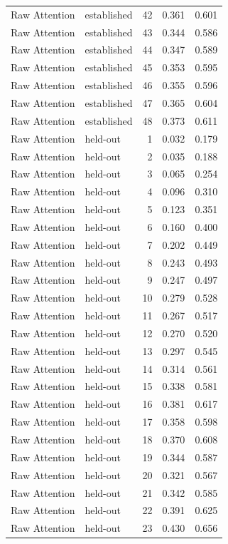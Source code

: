 \begin{tabular}{llrrr}
Raw Attention & established & 42 & 0.361 & 0.601 \\
Raw Attention & established & 43 & 0.344 & 0.586 \\
Raw Attention & established & 44 & 0.347 & 0.589 \\
Raw Attention & established & 45 & 0.353 & 0.595 \\
Raw Attention & established & 46 & 0.355 & 0.596 \\
Raw Attention & established & 47 & 0.365 & 0.604 \\
Raw Attention & established & 48 & 0.373 & 0.611 \\
Raw Attention & held-out & 1 & 0.032 & 0.179 \\
Raw Attention & held-out & 2 & 0.035 & 0.188 \\
Raw Attention & held-out & 3 & 0.065 & 0.254 \\
Raw Attention & held-out & 4 & 0.096 & 0.310 \\
Raw Attention & held-out & 5 & 0.123 & 0.351 \\
Raw Attention & held-out & 6 & 0.160 & 0.400 \\
Raw Attention & held-out & 7 & 0.202 & 0.449 \\
Raw Attention & held-out & 8 & 0.243 & 0.493 \\
Raw Attention & held-out & 9 & 0.247 & 0.497 \\
Raw Attention & held-out & 10 & 0.279 & 0.528 \\
Raw Attention & held-out & 11 & 0.267 & 0.517 \\
Raw Attention & held-out & 12 & 0.270 & 0.520 \\
Raw Attention & held-out & 13 & 0.297 & 0.545 \\
Raw Attention & held-out & 14 & 0.314 & 0.561 \\
Raw Attention & held-out & 15 & 0.338 & 0.581 \\
Raw Attention & held-out & 16 & 0.381 & 0.617 \\
Raw Attention & held-out & 17 & 0.358 & 0.598 \\
Raw Attention & held-out & 18 & 0.370 & 0.608 \\
Raw Attention & held-out & 19 & 0.344 & 0.587 \\
Raw Attention & held-out & 20 & 0.321 & 0.567 \\
Raw Attention & held-out & 21 & 0.342 & 0.585 \\
Raw Attention & held-out & 22 & 0.391 & 0.625 \\
Raw Attention & held-out & 23 & 0.430 & 0.656 \\

\end{tabular}
